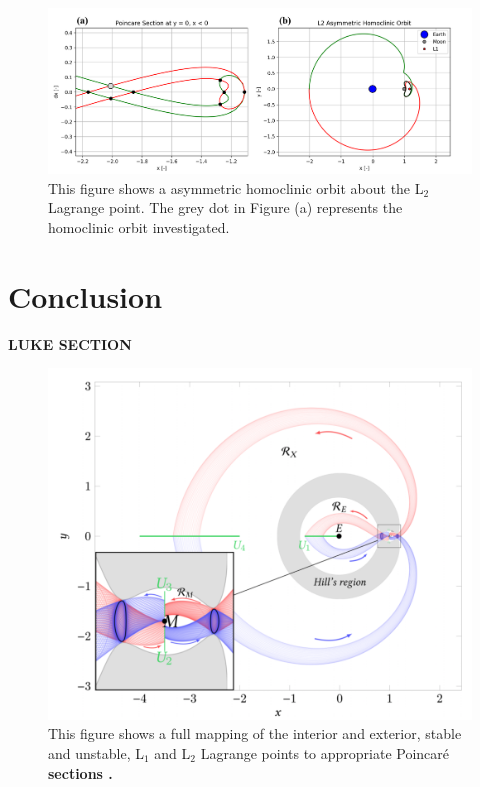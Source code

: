 \documentclass[11pt]{article} %
\begin{document}
\begin{figure}[H]
    \centering
    \includegraphics[width=\textwidth]{asym_homo_comb.png}
    \caption{This figure shows a asymmetric homoclinic orbit about the L$_2$ Lagrange point. The grey dot in Figure (a) represents the homoclinic orbit investigated.}
    \label{f:asym_homo}
\end{figure}


\section{Conclusion}
\color{red}\textbf{LUKE SECTION}\color{black}\\

\begin{figure}[H]
    \centering
    \includegraphics[width=5in]{interior_exterior.png}
    \caption{This figure shows a full mapping of the interior and exterior, stable and unstable, L$_1$ and L$_2$ Lagrange points to appropriate Poincar\'{e} \textbf{sections \cite{KoonLoMarsdenRoss2011}.}}
    \label{f:interior_exterior}
\end{figure}

\newpage


\end{document}
